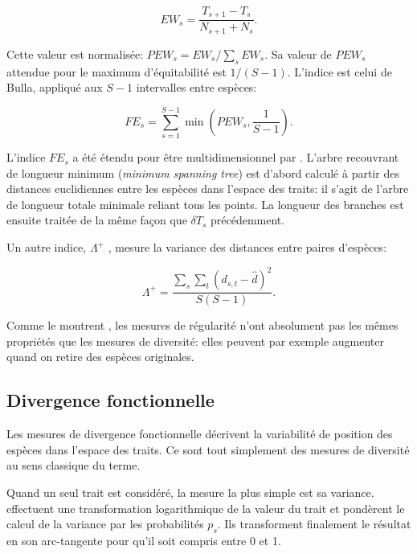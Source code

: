 \documentclass[
  11pt,
  french,
  a4paper,
  extrafontsizes,onecolumn,openright
  ]{memoir}
\begin{document}
\begin{equation}
  \label{eq:EWs}
  \mathit{EW}_{s} = \frac{T_{s+1}-T_{s}}{N_{s+1}+N_{s}}.
\end{equation}

Cette valeur est normalisée: \(\mathit{PEW}_{s}={\mathit{EW}_{s}}/{\sum_s{\mathit{EW}_{s}}}\).
Sa valeur de \(\mathit{PEW}_{s}\) attendue pour le maximum d'équitabilité est \({1}/{(S-1)}\).
L'indice est celui de Bulla, appliqué aux \(S-1\) intervalles entre espèces:

\begin{equation}
  \label{eq:FEs}
  \mathit{FE}_{s} = \sum_{s=1}^{S-1}{\min(\mathit{PEW}_{s},\frac{1}{S-1})}.
\end{equation}

L'indice \(\mathit{FE}_{s}\) a été étendu pour être multidimensionnel par \textcite{Villeger2008a}.
L'arbre recouvrant de longueur minimum (\emph{minimum spanning tree}) est d'abord calculé à partir des distances euclidiennes entre les espèces dans l'espace des traits: il s'agit de l'arbre de longueur totale minimale reliant tous les points.
La longueur des branches est ensuite traitée de la même façon que \(\delta T_s\) précédemment.

Un autre indice, \({\Lambda}^+\) \autocite{Clarke2001}, mesure la variance des distances entre paires d'espèces:

\begin{equation}
  \label{eq:Clarke2001}
  {\Lambda}^+ =\frac{\sum_s{\sum_t{{\left(d_{s,t}-\hat{d}\right)}^2}}}{S\left(S-1\right)}.
\end{equation}

Comme le montrent \textcite{Merigot2011}, les mesures de régularité n'ont absolument pas les mêmes propriétés que les mesures de diversité: elles peuvent par exemple augmenter quand on retire des espèces originales.

\subsection{Divergence fonctionnelle}\label{divergence-fonctionnelle}

Les mesures de divergence fonctionnelle décrivent la variabilité de position des espèces dans l'espace des traits.
Ce sont tout simplement des mesures de diversité au sens classique du terme.

Quand un seul trait est considéré, la mesure la plus simple est sa variance.
\textcite{Mason2003} effectuent une transformation logarithmique de la valeur du trait et pondèrent le calcul de la variance par les probabilités \(p_s\).
Ils transforment finalement le résultat en son arc-tangente pour qu'il soit compris entre 0 et 1.
\end{document}
